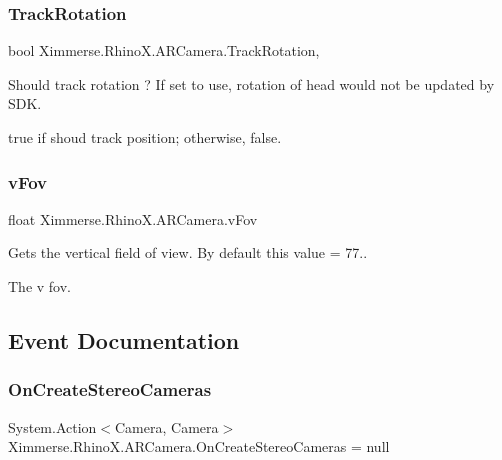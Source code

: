 \subsubsection{\texorpdfstring{Track\+Rotation}{TrackRotation}}
{\footnotesize\ttfamily bool Ximmerse.\+Rhino\+X.\+A\+R\+Camera.\+Track\+Rotation\hspace{0.3cm}{\ttfamily [get]}, {\ttfamily [set]}}



Should track rotation ? If set to use, rotation of head would not be updated by S\+DK. 

{\ttfamily true} if shoud track position; otherwise, {\ttfamily false}.\mbox{\label{class_ximmerse_1_1_rhino_x_1_1_a_r_camera_a386210a7a33ca8df7dd6fd8e0530bb55}} 
\subsubsection{\texorpdfstring{v\+Fov}{vFov}}
{\footnotesize\ttfamily float Ximmerse.\+Rhino\+X.\+A\+R\+Camera.\+v\+Fov\hspace{0.3cm}{\ttfamily [get]}}



Gets the vertical field of view. By default this value = 77.. 

The v fov.

\subsection{Event Documentation}
\mbox{\label{class_ximmerse_1_1_rhino_x_1_1_a_r_camera_a635b0074257b24358550492fa56389e7}} 
\subsubsection{\texorpdfstring{On\+Create\+Stereo\+Cameras}{OnCreateStereoCameras}}
{\footnotesize\ttfamily System.\+Action$<$Camera, Camera$>$ Ximmerse.\+Rhino\+X.\+A\+R\+Camera.\+On\+Create\+Stereo\+Cameras = null\hspace{0.3cm}{\ttfamily [static]}}



